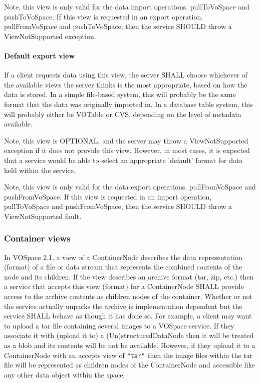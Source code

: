 \documentclass[11pt,a4paper]{ivoa}
\begin{document}
Note, this view is only valid for the data import operations, pullToVoSpace and pushToVoSpace. If this view is requested in an export operation, pullFromVoSpace and pushToVoSpace, then the service SHOULD throw a ViewNotSupported exception.

\paragraph{Default export view}
If a client requests data using this view, the server SHALL choose whichever of the available views the server thinks is the most appropriate, based on how the data is stored. In a simple file-based system, this will probably be the same format that the data was originally imported in. In a database table system, this will probably either be VOTable or CVS, depending on the level of metadata available.

Note, this view is OPTIONAL, and the server may throw a ViewNotSupported exception if it does not provide this view. However, in most cases, it is expected that a service would be able to select an appropriate 'default' format for data held within the service.

Note, this view is only valid for the data export operations, pullFromVoSpace and pushFromVoSpace. If this view is requested in an import operation, pullToVoSpace and pushFromVoSpace, then the service SHOULD throw a ViewNotSupported fault.

\subsubsection{Container views}
\label{subsubsec:container views}
In VOSpace 2.1, a view of a ContainerNode describes the data representation (format) of a file or data stream that represents the combined contents of the node and its children. If the view describes an archive format (tar, zip, etc.) then a service that accepts this view (format) for a ContainerNode SHALL provide access to the archive contents as children nodes of the container. Whether or not the service actually unpacks the archive is implementation dependent but the service SHALL behave as though it has done so. For example, a client may want to upload a tar file containing several images to a VOSpace service. If they associate it with (upload it to) a (Un)structuredDataNode then it will be treated as a blob and its contents will be not be available. However, if they upload it to a ContainerNode with an accepts view of \verb|"tar"| then the image files within the tar file will be represented as children nodes of the ContainerNode and accessible like any other data object within the space.
\end{document}
